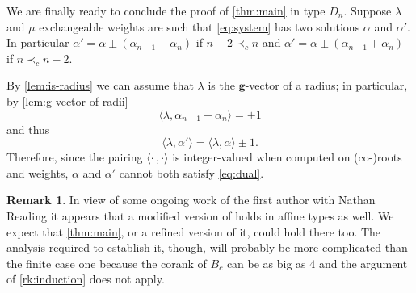 \documentclass[11pt]{amsart}
\newcommand{\bg}{\mathbf{g}}
\theoremstyle{definition}
\newtheorem{remark}[theorem]{Remark}
\numberwithin{equation}{section}
\numberwithin{figure}{section}
\begin{document}
  We are finally ready to conclude the proof of \cref{thm:main} in type $D_n$.
  Suppose $\lambda$ and $\mu$ exchangeable weights are such that \cref{eq:system} has two solutions $\alpha$ and $\alpha'$.
  In particular $\alpha' = \alpha \pm (\alpha_{n-1}-\alpha_n)$ if $n-2 \prec_c n$ and $\alpha' = \alpha \pm (\alpha_{n-1}+\alpha_n)$ if $n \prec_c n-2$.

  By \cref{lem:is-radius} we can assume that $\lambda$ is the $\bg$-vector of a radius; in particular, by \cref{lem:g-vector-of-radii}
  \[
    \langle \lambda, \alpha_{n-1}\pm \alpha_n \rangle = \pm 1
  \]
  and thus
  \[
    \langle \lambda, \alpha' \rangle =
    \langle \lambda, \alpha \rangle \pm 1.
  \]
  Therefore, since the pairing $\langle\cdot\,,\cdot\rangle$ is integer-valued when computed on (co-)roots and weights, $\alpha$ and $\alpha'$ cannot both satisfy \cref{eq:dual}.

  \begin{remark}
    In view of some ongoing work of the first author with Nathan Reading it appears that a modified version of \cite[Propositions 5.1 and 5.2]{Ste13} holds in affine types as well.
    We expect that \cref{thm:main}, or a refined version of it, could hold there too.
    The analysis required to establish it, though, will probably be more complicated than the finite case one because the corank of $B_c$ can be as big as $4$ and the argument of \cref{rk:induction} does not apply.
  \end{remark}


%
%
\end{document}
